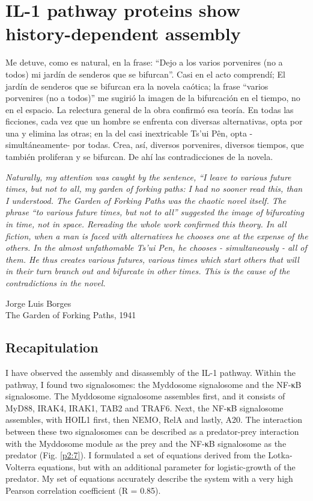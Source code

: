 \chapter{IL-1 pathway proteins show history-dependent assembly}
\label{chapter:chaos}
\epigraph{Me detuve, como es natural, en la frase: “Dejo a los varios porvenires (no a todos) mi jardín de senderos que se bifurcan”. Casi en el acto comprendí; El jardín de senderos que se bifurcan era la novela caótica; la frase “varios porvenires (no a todos)” me sugirió la imagen de la bifurcación en el tiempo, no en el espacio. La relectura general de la obra confirmó esa teoría. En todas las ficciones, cada vez que un hombre se enfrenta con diversas alternativas, opta por una y elimina las otras; en la del casi inextricable Ts'ui Pên, opta -simultáneamente- por todas. Crea, así, diversos porvenires, diversos tiempos, que también proliferan y se bifurcan. De ahí las contradicciones de la novela.\par
\vspace{\baselineskip}
\emph{Naturally, my attention was caught by the sentence, “I leave to various future times, but not to all, my garden of forking paths: I had no sooner read this, than I understood. The Garden of Forking Paths was the chaotic novel itself. The phrase “to various future times, but not to all” suggested the image of bifurcating in time, not in space. Rereading the whole work confirmed this theory. In all fiction, when a man is faced with alternatives he chooses one at the expense of the others. In the almost unfathomable Ts'ui Pen, he chooses - simultaneously - all of them. He thus creates various futures, various times which start others that will in their turn branch out and bifurcate in other times. This is the cause of the contradictions in the novel.}}{Jorge Luis Borges\\The Garden of Forking Paths, 1941}

\section{Recapitulation}
I have observed the assembly and disassembly of the IL-1 pathway. Within the pathway, I found two signalosomes: the Myddosome signalosome and the NF-κB signalosome. The Myddosome signalosome assembles first, and it consists of MyD88, IRAK4, IRAK1, TAB2 and TRAF6. Next, the NF-κB signalosome assembles, with HOIL1 first, then NEMO, RelA and lastly, A20. The interaction between these two signalosomes can be described as a predator-prey interaction with the Myddosome module as the prey and the NF-κB signalosome as the predator (Fig. \ref{p2:7}). I formulated a set of equations derived from the Lotka-Volterra equations, but with an additional parameter for logistic-growth of the predator. My set of equations accurately describe the system with a very high Pearson correlation coefficient (R = 0.85).

